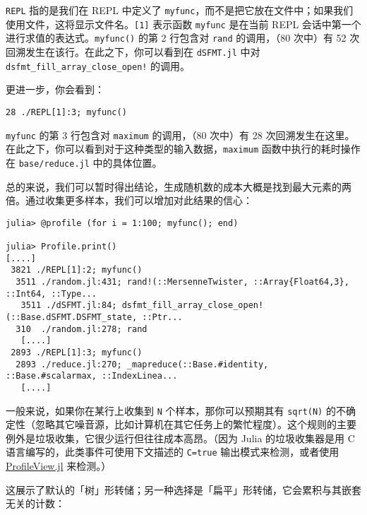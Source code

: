 \texttt{REPL} 指的是我们在 REPL 中定义了 \texttt{myfunc}，而不是把它放在文件中；如果我们使用文件，这将显示文件名。\texttt{[1]} 表示函数 \texttt{myfunc} 是在当前 REPL 会话中第一个进行求值的表达式。\texttt{myfunc()} 的第 2 行包含对 \texttt{rand} 的调用，（80 次中）有 52 次回溯发生在该行。在此之下，你可以看到在 \texttt{dSFMT.jl} 中对 \texttt{dsfmt\_fill\_array\_close\_open!} 的调用。



更进一步，你会看到：




\begin{lstlisting}
28 ./REPL[1]:3; myfunc()
\end{lstlisting}



\texttt{myfunc} 的第 3 行包含对 \texttt{maximum} 的调用，（80 次中）有 28 次回溯发生在这里。在此之下，你可以看到对于这种类型的输入数据，\texttt{maximum} 函数中执行的耗时操作在 \texttt{base/reduce.jl} 中的具体位置。



总的来说，我们可以暂时得出结论，生成随机数的成本大概是找到最大元素的两倍。通过收集更多样本，我们可以增加对此结果的信心：




\begin{verbatim}
julia> @profile (for i = 1:100; myfunc(); end)

julia> Profile.print()
[....]
 3821 ./REPL[1]:2; myfunc()
  3511 ./random.jl:431; rand!(::MersenneTwister, ::Array{Float64,3}, ::Int64, ::Type...
   3511 ./dSFMT.jl:84; dsfmt_fill_array_close_open!(::Base.dSFMT.DSFMT_state, ::Ptr...
  310  ./random.jl:278; rand
   [....]
 2893 ./REPL[1]:3; myfunc()
  2893 ./reduce.jl:270; _mapreduce(::Base.#identity, ::Base.#scalarmax, ::IndexLinea...
   [....]
\end{verbatim}



一般来说，如果你在某行上收集到 \texttt{N} 个样本，那你可以预期其有 \texttt{sqrt(N)} 的不确定性（忽略其它噪音源，比如计算机在其它任务上的繁忙程度）。这个规则的主要例外是垃圾收集，它很少运行但往往成本高昂。（因为 Julia 的垃圾收集器是用 C 语言编写的，此类事件可使用下文描述的 \texttt{C=true} 输出模式来检测，或者使用 \href{https://github.com/timholy/ProfileView.jl}{ProfileView.jl} 来检测。）



这展示了默认的「树」形转储；另一种选择是「扁平」形转储，它会累积与其嵌套无关的计数：




